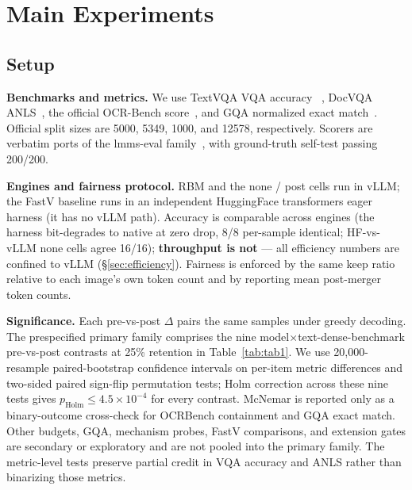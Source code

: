 \documentclass[journal]{IEEEtran}
\begin{document}
\section{Main Experiments}\label{sec:experiments}

\subsection{Setup}\label{sec:setup}

\textbf{Benchmarks and metrics.} We use TextVQA VQA accuracy
~\cite{singh2019textvqa}, DocVQA ANLS~\cite{mathew2021docvqa}, the official
OCR-Bench score~\cite{liu2024ocrbench}, and GQA normalized exact
match~\cite{hudson2019gqa}. Official split sizes are 5000, 5349, 1000, and
12578, respectively. Scorers
are verbatim ports of the lmms-eval family~\cite{zhang2024lmmseval}, with
ground-truth self-test passing 200/200.

\textbf{Engines and fairness protocol.} RBM and the none / post cells run in
vLLM; the FastV baseline runs in an independent HuggingFace transformers eager
harness (it has no vLLM path). Accuracy is comparable across engines (the harness
bit-degrades to native at zero drop, 8/8 per-sample identical; HF-vs-vLLM none
cells agree 16/16); \textbf{throughput is not} --- all efficiency numbers are
confined to vLLM (\S\ref{sec:efficiency}). Fairness is enforced by the same keep
ratio relative to each image's own token count and by reporting mean
post-merger token counts.

\textbf{Significance.} Each pre-vs-post $\Delta$ pairs the same samples under
greedy decoding. The prespecified primary family comprises the nine
model$\times$text-dense-benchmark pre-vs-post contrasts at 25\% retention in
Table~\ref{tab:tab1}. We use 20,000-resample paired-bootstrap confidence
intervals on per-item metric differences and two-sided paired sign-flip
permutation tests; Holm correction across these nine tests gives
$p_{\mathrm{Holm}}\leq4.5\times10^{-4}$ for every contrast. McNemar is reported
only as a binary-outcome cross-check for OCRBench containment and GQA exact
match. Other budgets, GQA, mechanism probes, FastV comparisons, and extension
gates are secondary or exploratory and are not pooled into the primary family.
The metric-level tests preserve partial credit in VQA accuracy and ANLS rather
than binarizing those metrics.
\end{document}
